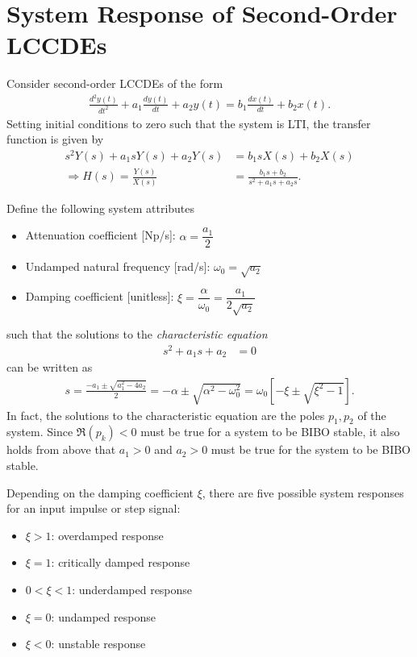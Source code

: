 \documentclass{report}
\begin{document}
\section{System Response of Second-Order LCCDEs}
Consider second-order LCCDEs of the form 
\begin{align}
    \frac{d^2y(t)}{dt^2} + a_1\frac{dy(t)}{dt} + a_2y(t) = b_1\frac{dx(t)}{dt} + b_2x(t).
\end{align}
Setting initial conditions to zero such that the system is LTI, the transfer function is given by 
\begin{align}
    s^2Y(s) + a_1sY(s) + a_2Y(s) &= b_1sX(s) + b_2X(s) \nonumber \\
    \Longrightarrow H(s) = \frac{Y(s)}{X(s)} &= \frac{b_1s+b_2}{s^2+a_1s+a_2s}.
\end{align}
\begin{tcolorbox}[width=\textwidth,colback={white}, sharp corners]
    Define the following system attributes
    \begin{itemize}
        \item Attenuation coefficient [Np/s]: $\alpha = \dfrac{a_1}{2}$
        \item Undamped natural frequency [rad/s]: $\omega_0 = \sqrt{a_2}$
        \item Damping coefficient [unitless]: $\xi = \dfrac{\alpha}{\omega_0} = \dfrac{a_1}{2\sqrt{a_2}}$
    \end{itemize}
\end{tcolorbox}
\noindent such that the solutions to the \emph{characteristic equation}
\begin{align}
    s^2 + a_1s + a_2 &= 0
\end{align}
can be written as 
\begin{align}
    s = \frac{-a_1\pm\sqrt{a_1^2-4a_2}}{2} = -\alpha \pm \sqrt{\alpha^2-\omega_0^2} = \omega_0\left[-\xi\pm\sqrt{\xi^2-1}\right].
\end{align}
In fact, the solutions to the characteristic equation are the poles $p_1, p_2$ of the system. Since $\Re(p_k) < 0$ must be true for a system to be BIBO stable, 
it also holds from above that $a_1>0$ and $a_2>0$ must be true for the system to be BIBO stable.
\begin{tcolorbox}[width=\textwidth,colback={white}, sharp corners]
    Depending on the damping coefficient $\xi$, there are five possible system responses for an input impulse or step signal:
    \begin{itemize}
        \item $\xi > 1$: overdamped response
        \item $\xi = 1$: critically damped response
        \item $0 < \xi < 1$: underdamped response
        \item $\xi = 0$: undamped response
        \item $\xi < 0$: unstable response
    \end{itemize}
\end{tcolorbox}
\end{document}
